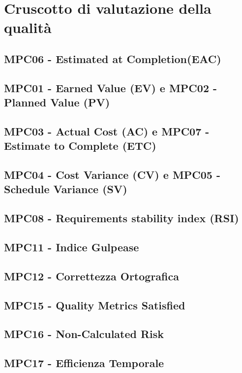 \section{Cruscotto di valutazione della qualità}
\subsection{MPC06 - Estimated at Completion(EAC)}
\subsection{MPC01 - Earned Value (EV) e MPC02 - Planned Value (PV)}
\subsection{MPC03 - Actual Cost (AC) e MPC07 - Estimate to Complete (ETC)}
\subsection{MPC04 - Cost Variance (CV) e MPC05 - Schedule Variance (SV)}
\subsection{MPC08 - Requirements stability index (RSI)}
\subsection{MPC11 - Indice Gulpease}
\subsection{MPC12 - Correttezza Ortografica}
\subsection{MPC15 - Quality Metrics Satisfied}
\subsection{MPC16 - Non-Calculated Risk}
\subsection{MPC17 - Efficienza Temporale}
